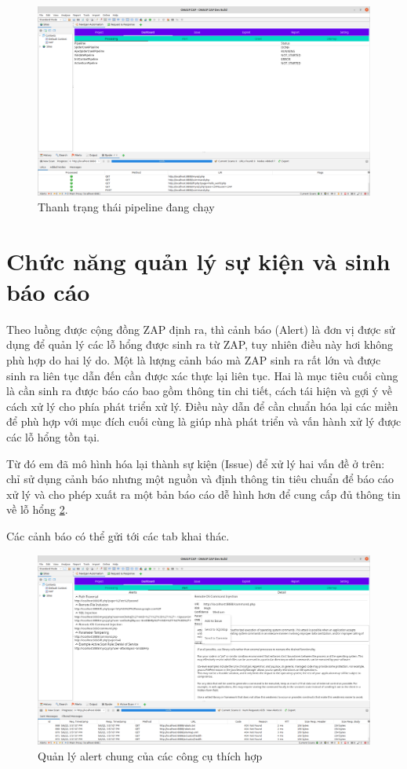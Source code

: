 \documentclass[./../main.tex]{subfiles}
\begin{document}
\begin{figure}[ht!]
	\includegraphics[width=\linewidth]{./images/state.png}
	\caption{Thanh trạng thái pipeline đang chạy}
	\label{fig:state}
\end{figure}

\section{Chức năng quản lý sự kiện và sinh báo cáo}
Theo luồng được cộng đồng ZAP định ra, thì cảnh báo (Alert) là đơn
vị được sử dụng để quản lý các lỗ hổng được sinh ra từ ZAP, tuy nhiên
điều này hơi không phù hợp do hai lý do. Một là lượng cảnh báo mà ZAP
sinh ra rất lớn và được sinh ra liên tục dẫn đến cần được xác thực lại
liên tục. Hai là mục tiêu cuối cùng là cần sinh ra được báo cáo bao gồm
thông tin chi tiết, cách tái hiện và gợi ý về cách xử lý cho phía
phát triển xử lý. Điều này dẫn để cần chuẩn hóa lại các miền để
phù hợp với mục đích cuối cùng là giúp nhà phát triển và vấn hành
xử lý được các lỗ hổng tồn tại.

Từ đó em đã mô hình hóa lại thành sự kiện (Issue) để xử lý hai vấn đề ở trên:
chỉ sử dụng cảnh báo nhưng một nguồn và định thông tin tiêu chuẩn để
báo cáo xử lý và cho phép xuất ra một bản báo cáo dễ hình hơn để cung
cấp đủ thông tin về lỗ hổng \ref{fig:alert}.

Các cảnh báo có thể gửi tới các tab khai thác.

\begin{figure}[ht!]
	\includegraphics[width=\linewidth]{./images/alert.png}
	\caption{Quản lý alert chung của các công cụ thích hợp}
	\label{fig:alert}
\end{figure}
\end{document}
